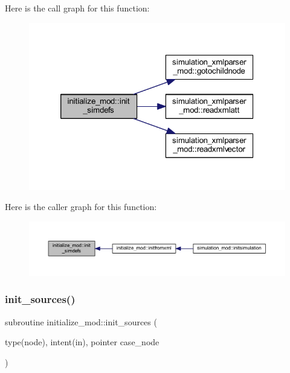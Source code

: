 Here is the call graph for this function\+:\nopagebreak
\begin{figure}[H]
\begin{center}
\leavevmode
\includegraphics[width=320pt]{namespaceinitialize__mod_a18736cca205403067232125b8e510ab2_cgraph}
\end{center}
\end{figure}
Here is the caller graph for this function\+:\nopagebreak
\begin{figure}[H]
\begin{center}
\leavevmode
\includegraphics[width=350pt]{namespaceinitialize__mod_a18736cca205403067232125b8e510ab2_icgraph}
\end{center}
\end{figure}
\mbox{\label{namespaceinitialize__mod_aae6a35bca190cdf65a6146f254264cd1}} 
\subsubsection{\texorpdfstring{init\+\_\+sources()}{init\_sources()}}
{\footnotesize\ttfamily subroutine initialize\+\_\+mod\+::init\+\_\+sources (\begin{DoxyParamCaption}\item[{type(node), intent(in), pointer}]{case\+\_\+node }\end{DoxyParamCaption})\hspace{0.3cm}{\ttfamily [private]}}



